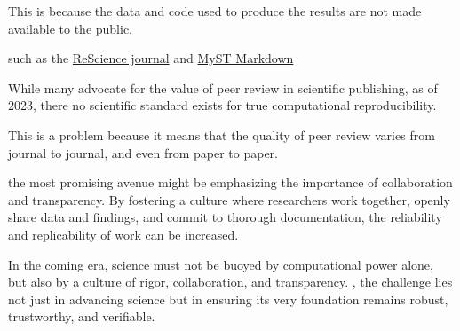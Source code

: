 This is because the data and code used to produce the results are not made available to the public. 

such as the \href{https://rescience.github.io/}{ReScience journal} and \href{https://jupyterbook.org/en/stable/content/myst.html}{MyST Markdown}

While many advocate for the value of peer review in scientific publishing, as of 2023, there no scientific standard exists for true computational reproducibility. 

This is a problem because it means that the quality of peer review varies from journal to journal, and even from paper to paper. 

the most promising avenue might be emphasizing the importance of collaboration and transparency. By fostering a culture where researchers work together, openly share data and findings, and commit to thorough documentation, the reliability and replicability of work can be increased.

In the coming era, science must not be buoyed by computational power alone, but also by a culture of rigor, collaboration, and transparency.
, the challenge lies not just in advancing science but in ensuring its very foundation remains robust, trustworthy, and verifiable. 
